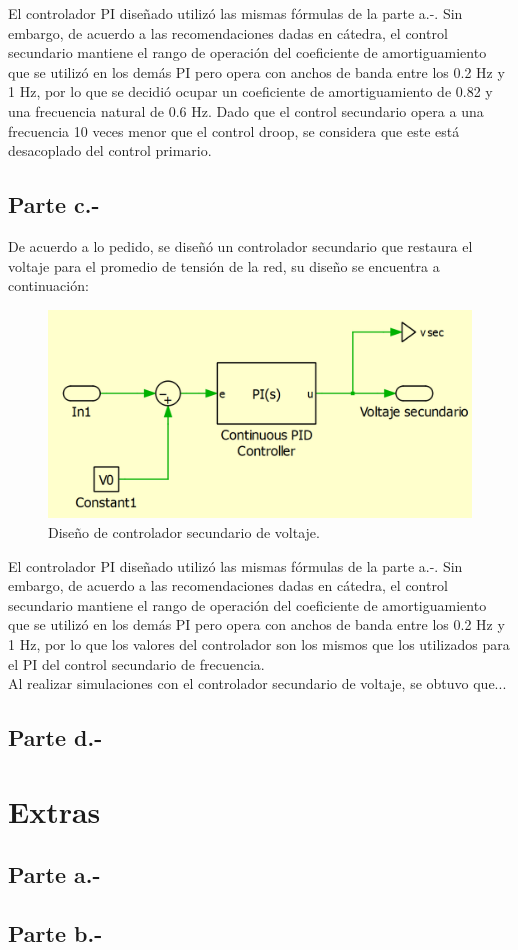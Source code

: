 El controlador PI diseñado utilizó las mismas fórmulas de la parte a.-. Sin embargo, de acuerdo a las recomendaciones dadas en cátedra, el control secundario mantiene el rango de operación del coeficiente de amortiguamiento que se utilizó en los demás PI pero opera con anchos de banda entre los 0.2 Hz y 1 Hz, por lo que se decidió ocupar un coeficiente de amortiguamiento de 0.82 y una frecuencia natural de 0.6 Hz. Dado que el control secundario opera a una frecuencia 10 veces menor que el control droop, se considera que este está desacoplado del control primario.

\subsection{Parte c.-}

De acuerdo a lo pedido, se diseñó un controlador secundario que restaura el voltaje para el promedio de tensión de la red, su diseño se encuentra a continuación:

\begin{figure}
   \centering
   \includegraphics[width=0.5\linewidth]{Tarea 1/report/imagenes/p3c/secundario voltaje.png}
   \caption{Diseño de controlador secundario de voltaje.}
   \label{diseñosecvoltaje}
\end{figure}

El controlador PI diseñado utilizó las mismas fórmulas de la parte a.-. Sin embargo, de acuerdo a las recomendaciones dadas en cátedra, el control secundario mantiene el rango de operación del coeficiente de amortiguamiento que se utilizó en los demás PI pero opera con anchos de banda entre los 0.2 Hz y 1 Hz, por lo que los valores del controlador son los mismos que los utilizados para el PI del control secundario de frecuencia.\\

Al realizar simulaciones con el controlador secundario de voltaje, se obtuvo que...

\subsection{Parte d.-}



\section{Extras}

\subsection{Parte a.-}



\subsection{Parte b.-}



